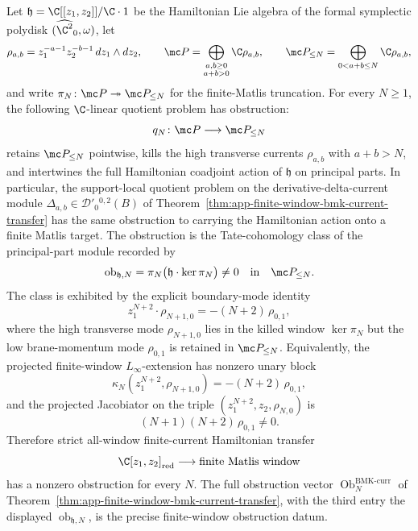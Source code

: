 \begin{thm}\label{thm:bmk-finite-window-obstruction}
  Let \(\mathfrak h=\C[[z_1,z_2]]/\C\cdot1\) be the Hamiltonian Lie
  algebra of the formal symplectic polydisk \((\widehat{\C^2}_0,\omega)\),
  let
  \[
    \rho_{a,b}=z_1^{-a-1}z_2^{-b-1}\,dz_1\wedge dz_2,
    \qquad
    \mc P=\bigoplus_{\substack{a,b\geq0\\a+b>0}}\C\rho_{a,b},
    \qquad
    \mc P_{\leq N}=\bigoplus_{0<a+b\leq N}\C\rho_{a,b},
  \]
  and write \(\pi_N\colon\mc P\twoheadrightarrow\mc P_{\leq N}\) for the
  finite-Matlis truncation.  For every \(N\geq1\), the following
  \(\C\)-linear quotient problem has obstruction:
  \[
    q_N\colon\mc P\longrightarrow\mc P_{\leq N}
  \]
  retains \(\mc P_{\leq N}\) pointwise, kills the high transverse
  currents \(\rho_{a,b}\) with \(a+b>N\), and intertwines the full
  Hamiltonian coadjoint action of \(\mathfrak h\) on principal parts.
  In particular, the support-local quotient problem on the
  derivative-delta-current module
  \(\Delta_{a,b}\in\mathcal D'_0{}^{0,2}(B)\) of
  Theorem~\ref{thm:app-finite-window-bmk-current-transfer} has the same
  obstruction to carrying the Hamiltonian action onto a finite Matlis
  target.  The obstruction is the
  Tate-cohomology class of the principal-part module recorded by
  \[
    \operatorname{ob}_{\mathfrak h,N}
      =\pi_N\bigl(\mathfrak h\cdot\ker\pi_N\bigr)
      \neq 0
    \quad\text{in}\quad
    \mc P_{\leq N}.
  \]
  The class is exhibited by the explicit boundary-mode identity
  \begin{equation}\label{eq:bmk-bockstein-identity}
    z_1^{N+2}\cdot\rho_{N+1,0}=-(N+2)\,\rho_{0,1},
  \end{equation}
  where the high transverse mode \(\rho_{N+1,0}\) lies in the killed
  window \(\ker\pi_N\) but the low brane-momentum mode \(\rho_{0,1}\)
  is retained in \(\mc P_{\leq N}\).  Equivalently, the projected
  finite-window \(L_\infty\)-extension has nonzero unary block
  \[
    \kappa_N(z_1^{N+2},\rho_{N+1,0})=-(N+2)\,\rho_{0,1},
  \]
  and the projected Jacobiator on the triple
  \((z_1^{N+2},z_2,\rho_{N,0})\) is
  \begin{equation}\label{eq:bmk-bockstein-jacobiator}
    (N+1)(N+2)\,\rho_{0,1}\neq 0.
  \end{equation}
  Therefore strict all-window finite-current Hamiltonian transfer
  \[
    \C[z_1,z_2]_{\mathrm{red}}\longrightarrow
    \mathrm{finite\ Matlis\ window}
  \]
  has a nonzero obstruction for every \(N\).  The
  full obstruction vector
  \(\operatorname{Ob}^{\mathrm{BMK\mbox{-}curr}}_N\) of
  Theorem~\ref{thm:app-finite-window-bmk-current-transfer}, with the
  third entry the displayed
  \(\operatorname{ob}_{\mathfrak h,N}\), is the precise finite-window
  obstruction datum.
\end{thm}

